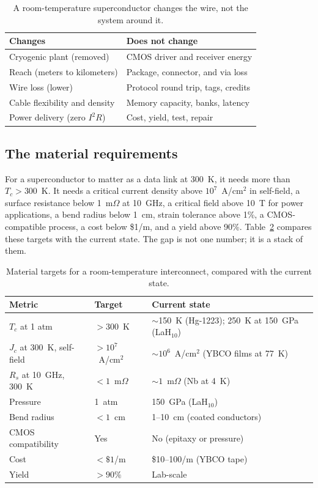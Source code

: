\documentclass[10pt,letterpaper]{article}
\begin{document}
\begin{table}[t]
\centering
\caption{A room-temperature superconductor changes the wire, not the system around it.}
\label{tab:changes}
\small
\begin{tabularx}{\linewidth}{@{}XX@{}}
\toprule
Changes & Does not change \\
\midrule
Cryogenic plant (removed) & CMOS driver and receiver energy \\
Reach (meters to kilometers) & Package, connector, and via loss \\
Wire loss (lower) & Protocol round trip, tags, credits \\
Cable flexibility and density & Memory capacity, banks, latency \\
Power delivery (zero $I^2R$) & Cost, yield, test, repair \\
\bottomrule
\end{tabularx}
\end{table}

\subsection{The material requirements}

For a superconductor to matter as a data link at 300~K, it needs more than $T_c > 300$~K. It needs a critical current density above $10^7$~A/cm$^2$ in self-field, a surface resistance below 1~m$\Omega$ at 10~GHz, a critical field above 10~T for power applications, a bend radius below 1~cm, strain tolerance above 1\%, a CMOS-compatible process, a cost below \$1/m, and a yield above 90\%. Table~\ref{tab:targets} compares these targets with the current state. The gap is not one number; it is a stack of them.

\begin{table}[t]
\centering
\caption{Material targets for a room-temperature interconnect, compared with the current state.}
\label{tab:targets}
\small
\begin{tabularx}{\linewidth}{@{}lXX@{}}
\toprule
Metric & Target & Current state \\
\midrule
$T_c$ at 1 atm & $>300$~K & $\sim$150~K (Hg-1223); 250~K at 150~GPa (LaH$_{10}$) \\
$J_c$ at 300~K, self-field & $>10^7$~A/cm$^2$ & $\sim10^6$~A/cm$^2$ (YBCO films at 77~K) \\
$R_s$ at 10~GHz, 300~K & $<1$~m$\Omega$ & $\sim1$~m$\Omega$ (Nb at 4~K) \\
Pressure & 1~atm & 150~GPa (LaH$_{10}$) \\
Bend radius & $<1$~cm & 1--10~cm (coated conductors) \\
CMOS compatibility & Yes & No (epitaxy or pressure) \\
Cost & $<\$1$/m & \$10--100/m (YBCO tape) \\
Yield & $>90\%$ & Lab-scale \\
\bottomrule
\end{tabularx}
\end{table}
\end{document}
